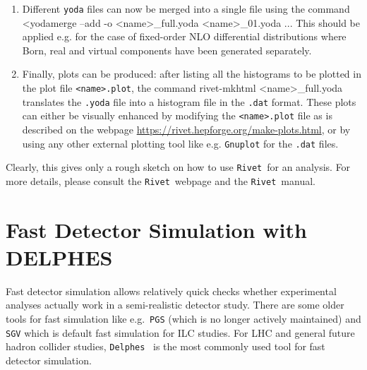 \documentclass[12pt]{book}
\newenvironment{code}%
  {\begingroup\footnotesize
   \quote
   \Verbatim}%
  {\endVerbatim
   \endquote
   \endgroup\noindent}
\newcommand{\ttt}[1]{\texttt{#1}}
\newcommand{\delphes}{\ttt{Delphes}}
\newcommand{\rivet}{\ttt{Rivet}}
\begin{document}
\begin{enumerate}
\item
  Different \ttt{yoda} files can now be merged into a single file
  using the command
  \begin{code}
    <yodamerge --add -o <name>_full.yoda <name>_01.yoda ...
  \end{code}
  This should be applied e.g. for the case of fixed-order NLO
  differential distributions where Born, real and virtual components
  have been generated separately.

\item
  Finally, plots can be produced: after listing all the histograms to
  be plotted in the plot file \ttt{<name>.plot}, the command
  \begin{code}
    rivet-mkhtml <name>_full.yoda
  \end{code}
  translates the \ttt{.yoda} file into a histogram file in the
  \ttt{.dat} format. These plots can either be visually enhanced by
  modifying the \ttt{<name>.plot} file as is described on the webpage
  \url{https://rivet.hepforge.org/make-plots.html}, or by using any
  other external plotting tool like e.g. \ttt{Gnuplot} for the
  \ttt{.dat} files.

\end{enumerate}

Clearly, this gives only a rough sketch on how to use \rivet\ for an
analysis. For more details, please consult the \rivet\ webpage and the
\rivet\ manual.


\vspace{1cm}

\section{Fast Detector Simulation with DELPHES}
\label{sec:delphes}

Fast detector simulation allows relatively quick checks whether
experimental analyses actually work in a semi-realistic detector
study. There are some older tools for fast simulation like
e.g.~\ttt{PGS} (which is no longer actively maintained) and \ttt{SGV}
which is default fast simulation for ILC studies. For LHC and general
future hadron collider studies, \delphes~\cite{deFavereau:2013fsa} is
the most commonly used tool for fast detector simulation.
\end{document}
